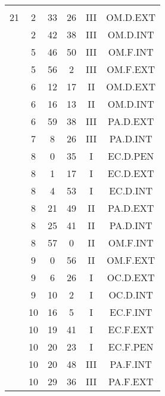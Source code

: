 \documentclass[12pt, a4paper]{article}
\begin{document}
\begin{multicols}{3}
{\begin{tabular}{c c c c c c}
	 	 	 	 & & & & & \\%
	 	 	 	21 & 2 & 33 & 26 & III & OM.D.EXT\\%
	 	 	 	 & 2 & 42 & 38 & III & OM.D.INT\\%
	 	 	 	 & 5 & 46 & 50 & III & OM.F.INT\\%
	 	 	 	 & 5 & 56 & 2 & III & OM.F.EXT\\%
	 	 	 	 & 6 & 12 & 17 & II & OM.D.EXT\\%
	 	 	 	 & 6 & 16 & 13 & II & OM.D.INT\\%
	 	 	 	 & 6 & 59 & 38 & III & PA.D.EXT\\%
	 	 	 	 & 7 & 8 & 26 & III & PA.D.INT\\%
	 	 	 	 & 8 & 0 & 35 & I & EC.D.PEN\\%
	 	 	 	 & 8 & 1 & 17 & I & EC.D.EXT\\%
	 	 	 	 & 8 & 4 & 53 & I & EC.D.INT\\%
	 	 	 	 & 8 & 21 & 49 & II & PA.D.EXT\\%
	 	 	 	 & 8 & 25 & 41 & II & PA.D.INT\\%
	 	 	 	 & 8 & 57 & 0 & II & OM.F.INT\\%
	 	 	 	 & 9 & 0 & 56 & II & OM.F.EXT\\%
	 	 	 	 & 9 & 6 & 26 & I & OC.D.EXT\\%
	 	 	 	 & 9 & 10 & 2 & I & OC.D.INT\\%
	 	 	 	 & 10 & 16 & 5 & I & EC.F.INT\\%
	 	 	 	 & 10 & 19 & 41 & I & EC.F.EXT\\%
	 	 	 	 & 10 & 20 & 23 & I & EC.F.PEN\\%
	 	 	 	 & 10 & 20 & 48 & III & PA.F.INT\\%
	 	 	 	 & 10 & 29 & 36 & III & PA.F.EXT\\%

\end{tabular}}
\end{multicols}
\end{document}
